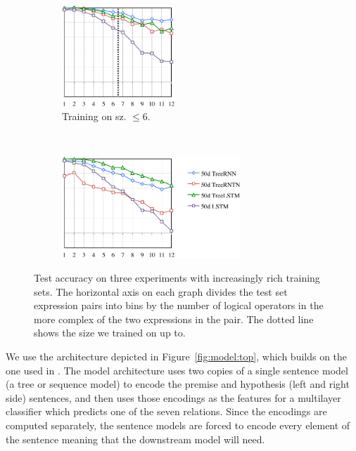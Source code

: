 \begin{figure}[t]
\begin{subfigure}[t]{0.24\textwidth}
  \end{subfigure}~~~~
\begin{subfigure}[t]{0.24\textwidth}
      \includegraphics[height=1.5in]{fig6c.pdf}
  \caption{Training on sz. $\le$6.}
\end{subfigure}~~
\begin{subfigure}[t]{0.08\textwidth}
      \includegraphics[height=1.5in]{leg.pdf}
\end{subfigure}
  \caption{Test accuracy on three experiments with increasingly rich training sets. The horizontal axis on each graph divides the test set expression pairs into bins by the number of logical operators in the more complex of the two expressions in the pair. The dotted line shows the size we trained on up to.}
  \label{prop-results} 
\end{figure}

We use the architecture depicted in Figure~\ref{fig:model:top}, which builds on the one used in . The model architecture uses two copies of a single sentence model (a tree or sequence model) to encode the premise and hypothesis (left and right side) sentences, and then uses those encodings as the features for a multilayer classifier which predicts one of the seven relations. Since the encodings are computed separately, the sentence models are forced to encode every element of the sentence meaning that the downstream model will need.


